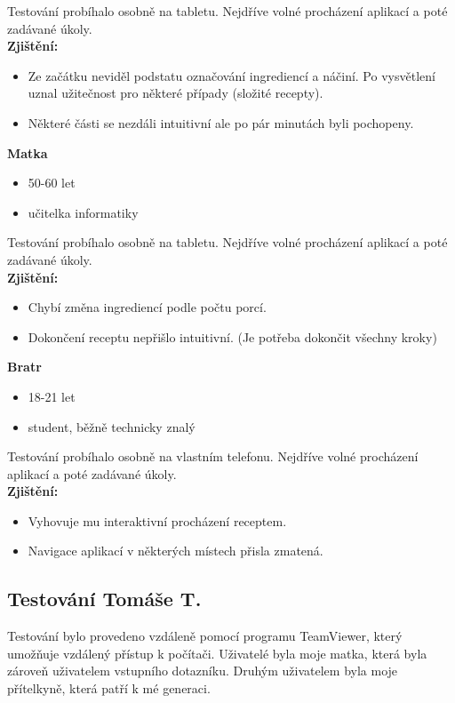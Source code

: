 \documentclass[a4paper, 11pt]{article}
\begin{document}
Testování probíhalo osobně na tabletu. Nejdříve volné procházení aplikací a poté zadávané úkoly. \\

\textbf{Zjištění:}
\begin{itemize}
	\item Ze začátku neviděl podstatu označování ingrediencí a náčiní. Po vysvětlení uznal užitečnost pro některé případy (složité recepty).
	\item Některé části se nezdáli intuitivní ale po pár minutách byli pochopeny.
\end{itemize}

\noindent\textbf{Matka} \\[-1em]
\begin{itemize}
    \item 50-60 let
	\item učitelka informatiky
\end{itemize}

Testování probíhalo osobně na tabletu. Nejdříve volné procházení aplikací a poté zadávané úkoly. \\

\textbf{Zjištění:}
\begin{itemize}
    \item Chybí změna ingrediencí podle počtu porcí.
	\item Dokončení receptu nepřišlo intuitivní. (Je potřeba dokončit všechny kroky)
\end{itemize}

\noindent\textbf{Bratr} \\[-1em]
\begin{itemize}
    \item 18-21 let
	\item student, běžně technicky znalý
\end{itemize}

Testování probíhalo osobně na vlastním telefonu. Nejdříve volné procházení aplikací a poté zadávané úkoly. \\

\textbf{Zjištění:}
\begin{itemize}
    \item Vyhovuje mu interaktivní procházení receptem.
	\item Navigace aplikací v některých místech přisla zmatená.
\end{itemize}

\subsection{Testování Tomáše T.}
Testování bylo provedeno vzdáleně pomocí programu TeamViewer, který umožňuje vzdálený přístup k počítači. Uživatelé
byla moje matka, která byla zároveň uživatelem vstupního dotazníku. Druhým uživatelem byla moje přítelkyně, která
patří k mé generaci. \\
\end{document}
